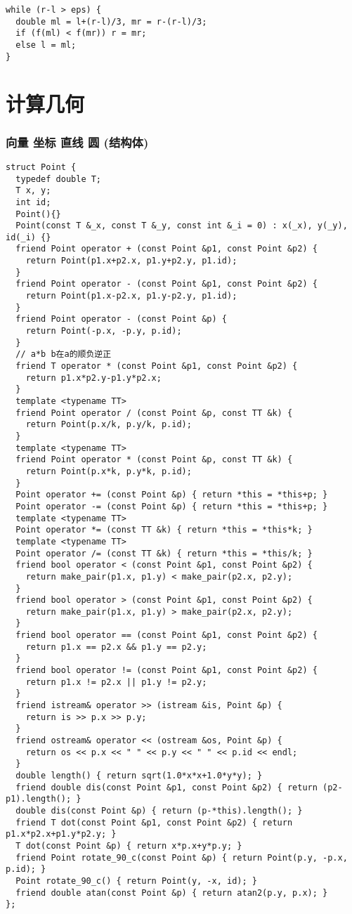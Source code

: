 \documentclass[12pt]{article}
\begin{document}
{{{{{{{{{\begin{lstlisting}
while (r-l > eps) {
  double ml = l+(r-l)/3, mr = r-(r-l)/3;
  if (f(ml) < f(mr)) r = mr;
  else l = ml;
}
\end{lstlisting}


\part{计算几何}
\section{向量 坐标 直线 圆 (结构体)}
{\setmainfont{Consolas}
\begin{lstlisting}
struct Point {
  typedef double T;
  T x, y;
  int id;
  Point(){}
  Point(const T &_x, const T &_y, const int &_i = 0) : x(_x), y(_y), id(_i) {}
  friend Point operator + (const Point &p1, const Point &p2) {
    return Point(p1.x+p2.x, p1.y+p2.y, p1.id);
  }
  friend Point operator - (const Point &p1, const Point &p2) {
    return Point(p1.x-p2.x, p1.y-p2.y, p1.id);
  }
  friend Point operator - (const Point &p) {
    return Point(-p.x, -p.y, p.id);
  }
  // a*b b在a的顺负逆正
  friend T operator * (const Point &p1, const Point &p2) {
    return p1.x*p2.y-p1.y*p2.x;
  }
  template <typename TT>
  friend Point operator / (const Point &p, const TT &k) {
    return Point(p.x/k, p.y/k, p.id);
  }
  template <typename TT>
  friend Point operator * (const Point &p, const TT &k) {
    return Point(p.x*k, p.y*k, p.id);
  }
  Point operator += (const Point &p) { return *this = *this+p; }
  Point operator -= (const Point &p) { return *this = *this+p; }
  template <typename TT>
  Point operator *= (const TT &k) { return *this = *this*k; }
  template <typename TT>
  Point operator /= (const TT &k) { return *this = *this/k; }
  friend bool operator < (const Point &p1, const Point &p2) {
    return make_pair(p1.x, p1.y) < make_pair(p2.x, p2.y);
  }
  friend bool operator > (const Point &p1, const Point &p2) {
    return make_pair(p1.x, p1.y) > make_pair(p2.x, p2.y);
  }
  friend bool operator == (const Point &p1, const Point &p2) {
    return p1.x == p2.x && p1.y == p2.y;
  }
  friend bool operator != (const Point &p1, const Point &p2) {
    return p1.x != p2.x || p1.y != p2.y;
  }
  friend istream& operator >> (istream &is, Point &p) {
    return is >> p.x >> p.y;
  }
  friend ostream& operator << (ostream &os, Point &p) {
    return os << p.x << " " << p.y << " " << p.id << endl;
  }
  double length() { return sqrt(1.0*x*x+1.0*y*y); }
  friend double dis(const Point &p1, const Point &p2) { return (p2-p1).length(); }
  double dis(const Point &p) { return (p-*this).length(); }
  friend T dot(const Point &p1, const Point &p2) { return p1.x*p2.x+p1.y*p2.y; }
  T dot(const Point &p) { return x*p.x+y*p.y; }
  friend Point rotate_90_c(const Point &p) { return Point(p.y, -p.x, p.id); }
  Point rotate_90_c() { return Point(y, -x, id); }
  friend double atan(const Point &p) { return atan2(p.y, p.x); }
};


\end{lstlisting}}}}}}}}}}}
\end{document}
